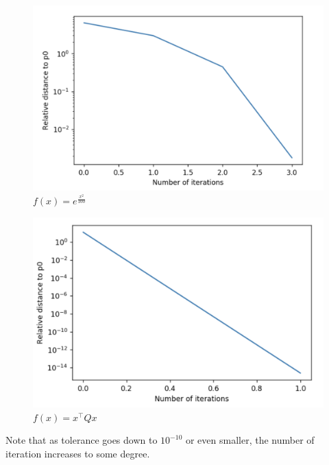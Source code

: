 \documentclass[11pt]{article}
\begin{document}
\begin{itemize}
\begin{figure}[htbp]
\centering
\includegraphics[width = .67\textwidth]{3.png}
\caption{$f(x) = e^{\frac{x^2}{100}}$}
\label{(3)}
\end{figure}
\begin{figure}[htbp]
\centering
\includegraphics[width = .67\textwidth]{4.png}
\caption{$f(x) = x^{\top}Q x$}
\label{(4)}
\end{figure}

Note that as tolerance goes down to $10^{-10}$ or even smaller, the number of iteration increases to some degree.
\end{itemize}
\end{document}
